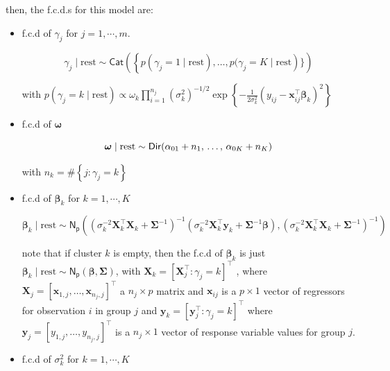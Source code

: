 then, the f.c.d.s for this model are:

\begin{itemize}
    \item f.c.d of $\gamma_j$ for $j=1,\cdots,m$.
    
    \begin{equation}
        \label{CHLRM_MCMC_gammaj}
        \gamma_j\mid \text{rest}\sim \mathsf{Cat}\left(\left\lbrace p(\gamma_j = 1 \mid \text{rest}),\dots,p(\gamma_j = K \mid \text{rest}\right) \rbrace\right)
    \end{equation}

    with $p(\gamma_j = k \mid \text{rest}) \propto \omega_k \prod_{i=1}^{n_j} (\sigma_k^2)^{-1/2} 
\exp\left\{ -\frac{1}{2\sigma_k^2} (y_{ij} - \bm{x}_{ij}^\top \bm{\beta}_k)^2 \right\}$

    \item f.c.d of $\bm{\omega}$

    \begin{equation}
    \label{CHLRM_MCMC_Omega}
    \bm{\omega} \mid \text{rest} \sim \mathsf{Dir}(\alpha_{01} + n_1,\,  \dots,\, \alpha_{0K} + n_K)\\
    \end{equation}

with $n_k=\#\left\lbrace j : \gamma_j=k\right\rbrace$

\item f.c.d of $\bm{\beta}_k$ for $k=1,\cdots,K$

\begin{equation}
\label{CHLRM_MCMC_Betak}
\bm{\beta}_k \mid \text{rest} \sim \mathsf{N_p}\left((\sigma_k^{-2}\bm{X}_{k}^\top\bm{X}_{k}+\bm{\Sigma}^{-1})^{-1}(\sigma_k^{-2}\bm{X}_{k}^\top\bm{y}_{k}+\bm{\Sigma}^{-1}\bm{\beta}) , (\sigma_k^{-2}\bm{X}_{k}^\top\bm{X}_{k}+\bm{\Sigma}^{-1})^{-1}\right)
\end{equation}

note that if cluster $k$ is empty, then the f.c.d of $\bm{\beta}_k$ is just $\bm{\beta}_k \mid \text{rest} \sim \mathsf{N_p}(\bm{\beta}, \bm{\Sigma})$, with $\bm{X}_{k} = [\bm{X}_j^\top : \gamma_j = k]^\top$ , where $\bm{X}_j = \left[\bm{x}_{1, j}, \ldots, \bm{x}_{n_j, j}\right]^\top$ a $n_j \times p$ matrix and $\bm{x}_{ij}$ is a $p \times 1$ vector of regressors for observation $i$ in group $j$ and $\bm{y}_{k} = [\bm{y}_j^\top : \gamma_j = k]^\top$ where $\bm{y}_j = \left[y_{1, j}, \ldots, y_{n_j, j}\right]^\top$  is a $n_j \times 1$ vector of response variable values for group $j$.

\item f.c.d of $\sigma_k^2$ for $k=1,\cdots,K$


\end{itemize}
